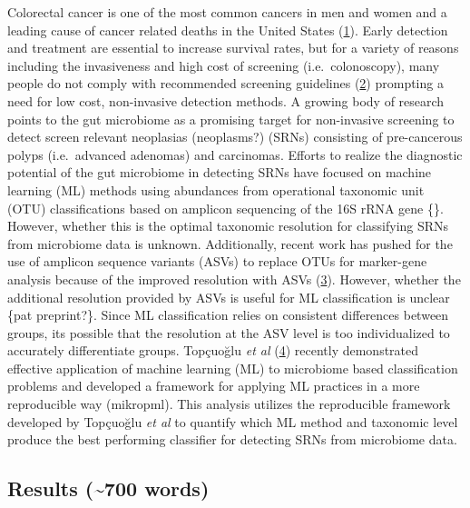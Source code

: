 \documentclass[
]{article}
\begin{document}
Colorectal cancer is one of the most common cancers in men and women and
a leading cause of cancer related deaths in the United States
(\protect\hyperlink{ref-siegel2020}{1}). Early detection and treatment
are essential to increase survival rates, but for a variety of reasons
including the invasiveness and high cost of screening
(i.e.~colonoscopy), many people do not comply with recommended screening
guidelines (\protect\hyperlink{ref-garcuxeda2011a}{2}) prompting a need
for low cost, non-invasive detection methods. A growing body of research
points to the gut microbiome as a promising target for non-invasive
screening to detect screen relevant neoplasias (neoplasms?) (SRNs)
consisting of pre-cancerous polyps (i.e.~advanced adenomas) and
carcinomas. Efforts to realize the diagnostic potential of the gut
microbiome in detecting SRNs have focused on machine learning (ML)
methods using abundances from operational taxonomic unit (OTU)
classifications based on amplicon sequencing of the 16S rRNA gene \{\}.
However, whether this is the optimal taxonomic resolution for
classifying SRNs from microbiome data is unknown. Additionally, recent
work has pushed for the use of amplicon sequence variants (ASVs) to
replace OTUs for marker-gene analysis because of the improved resolution
with ASVs (\protect\hyperlink{ref-callahan2017}{3}). However, whether
the additional resolution provided by ASVs is useful for ML
classification is unclear \{pat preprint?\}. Since ML classification
relies on consistent differences between groups, its possible that the
resolution at the ASV level is too individualized to accurately
differentiate groups. Topçuoğlu \emph{et al}
(\protect\hyperlink{ref-topuxe7uolu2020}{4}) recently demonstrated
effective application of machine learning (ML) to microbiome based
classification problems and developed a framework for applying ML
practices in a more reproducible way (mikropml). This analysis utilizes
the reproducible framework developed by Topçuoğlu \emph{et al} to
quantify which ML method and taxonomic level produce the best performing
classifier for detecting SRNs from microbiome data.

\hypertarget{results-700-words}{%
\subsection{Results (\textasciitilde700
words)}\label{results-700-words}}
\end{document}
